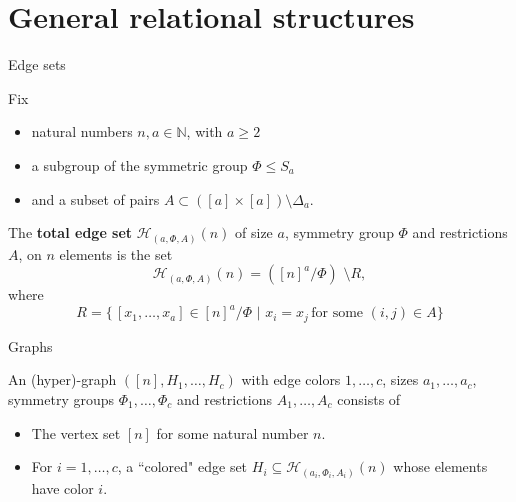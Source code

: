 \documentclass[11pt]{beamer}
\newcommand{\N}{\mathbb{N}}
\begin{document}
	\section{General relational structures}
	\begin{frame}{Edge sets}
		\begin{definition} Fix
			\begin{itemize}
				\item natural numbers $n,a\in \N$, with $a\geq 2$
				\item a subgroup of the symmetric group $\Phi \leq S_a$
				\item and a subset of pairs $A\subset ([a]\times [a]) \setminus \Delta_a$.
			\end{itemize}
		The \textbf{total edge set} $\mathcal{H}_{(a,\Phi, A)}(n)$ of size $a$, 
		symmetry group $\Phi$ and
		restrictions $A$, on $n$ elements is the set
		\[ \mathcal{H}_{(a,\Phi, A)}(n)= ([n]^a/\Phi) \, \,
		\setminus R, \]
		where
		\[ R = \{\,  [x_1, \dots,x_a] \in [n]^a/\Phi  \, \, 
		| \, \, x_i=x_j \, \text{for some } (i,j)\in A \} \] 
		\end{definition}
	\end{frame}
	\begin{frame}{Graphs}
		\begin{definition}
			An (hyper)-graph $([n], H_1,\dots, H_c)$ with edge colors 
			$1,\dots, c$, sizes $a_1,\dots,a_c$, 
			symmetry groups $\Phi_1,\dots,\Phi_c$ and 
			restrictions $A_1,\dots,A_c$ consists of 
			\begin{itemize}
				\item The vertex set $[n]$ for some natural number $n$.
				\item For $i=1,\dots,c$, a ``colored" edge set $H_i\subseteq \mathcal{H}_{(a_i,\Phi_i,A_i)}(n)$ whose elements 
				have color $i$.
			\end{itemize}
		\end{definition}
	\end{frame}
	 
\end{document}
